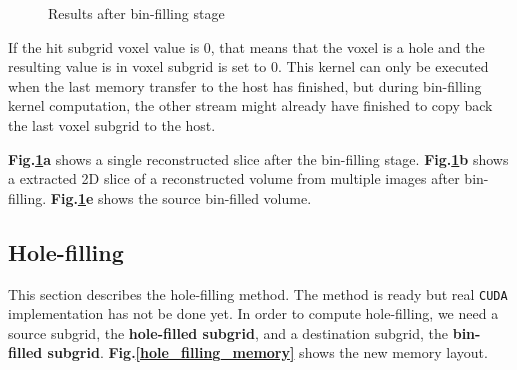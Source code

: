 \documentclass[12pt,journal,compsoc]{IEEEtran}
\begin{document}
\begin{figure}
\label{bad_grid}
\hfill
{}
\label{reconstructed_pnn_volume}
\hfill
{}
\label{cartilage_volume}
\hfill
\caption{Results after bin-filling stage}
\label{pnn_image_group}
\end{figure}


If the hit subgrid voxel value is 0, that means that the voxel is a hole and the resulting value is in voxel subgrid is set to 0.
This kernel can only be executed when the last memory transfer to the host has finished, but during bin-filling kernel computation, the other stream might already have finished to copy back the last voxel subgrid to the host.\par
\textbf{Fig.\ref{pnn_image_group}a} shows a single reconstructed slice after the bin-filling stage. \textbf{Fig.\ref{pnn_image_group}b} shows a extracted 2D slice of a reconstructed volume from multiple images after bin-filling. \textbf{Fig.\ref{pnn_image_group}e} shows the source bin-filled volume.

\subsection{Hole-filling}

This section describes the hole-filling method. The method is ready but real \texttt{CUDA} implementation has not be done yet. 
In order to compute hole-filling, we need a source subgrid, the \textbf{hole-filled subgrid}, and a destination subgrid, the \textbf{bin-filled subgrid}. \textbf{Fig.\ref{hole_filling_memory}} shows the new memory layout.
\end{document}

